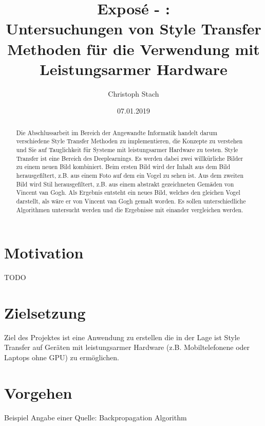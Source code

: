 


\title{\bf Exposé - \@exposeType:\protect\\ Untersuchungen von Style Transfer Methoden für die Verwendung mit Leistungsarmer Hardware}
\author{Christoph Stach}
\date{07.01.2019}



\maketitle

\begin{otherlanguage}{ngerman}
	\begin{abstract}
		Die Abschlussarbeit im Bereich der Angewandte Informatik handelt darum verschiedene Style Transfer Methoden zu implementieren,
		die Konzepte zu verstehen und Sie auf Tauglichkeit für Systeme mit leistungsarmer Hardware zu testen. Style Transfer ist eine Bereich des 
		Deeplearnings. Es werden dabei zwei willkürliche Bilder zu einem neuen Bild kombiniert. Beim ersten Bild wird der Inhalt aus dem Bild herausgefiltert,
		z.B. aus einem Foto auf dem ein Vogel zu sehen ist. Aus dem zweiten Bild wird Stil herausgefiltert, z.B. aus einem abstrakt gezeichneten Gemäden von Vincent van Gogh.
		Als Ergebnis entsteht ein neues Bild, welches den gleichen Vogel darstellt, als wäre er von Vincent van Gogh gemalt worden. 
		Es sollen unterschiedliche Algorithmen untersucht werden und die Ergebnisse mit einander vergleichen werden.
	\end{abstract}
\end{otherlanguage}

\section{Motivation}
TODO

\section{Zielsetzung}
Ziel des Projektes ist eine Anwendung zu erstellen die in der Lage ist
Style Transfer auf Geräten mit leistungsarmer Hardware (z.B. Mobiltelefonene oder Laptops ohne GPU) zu ermöglichen.

\section{Vorgehen}
Beispiel Angabe einer Quelle: Backpropagation Algorithm \cite{doi:10.1162/neco.1989.1.4.541}

